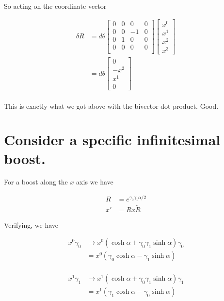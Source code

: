 \documentclass{article}
\begin{document}
So acting on the coordinate vector

\begin{align*}
\delta R &= d\theta
\begin{bmatrix}
0 & 0 & 0 & 0 \\
0 & 0 & -1 & 0 \\
0 & 1 & 0 & 0 \\
0 & 0 & 0 & 0 \\
\end{bmatrix} 
\begin{bmatrix}
x^0 \\
x^1 \\
x^2 \\
x^3
\end{bmatrix} \\
&=
d\theta
\begin{bmatrix}
0 \\
-x^2 \\
x^1 \\
0
\end{bmatrix} \\
\end{align*}

This is exactly what we got above with the bivector dot product.  Good.

\section{Consider a specific infinitesimal boost.}

For a boost along the $x$ axis we have

\begin{align}
R &= e^{\gamma_0\gamma_1 \alpha/2} \\
x' &= R x \tilde{R}
\end{align}

Verifying, we have

\begin{align*}
x^0 \gamma_0 
&\rightarrow x^0 ( \cosh\alpha + \gamma_0 \gamma_1 \sinh\alpha ) \gamma_0 \\
&= x^0 ( \gamma_0 \cosh\alpha - \gamma_1 \sinh\alpha ) \\
\end{align*}

\begin{align*}
x^1 \gamma_1 
&\rightarrow x^1 ( \cosh\alpha + \gamma_0 \gamma_1 \sinh\alpha ) \gamma_1 \\
&= x^1 ( \gamma_1 \cosh\alpha - \gamma_0 \sinh\alpha ) \\
\end{align*}
\end{document}
